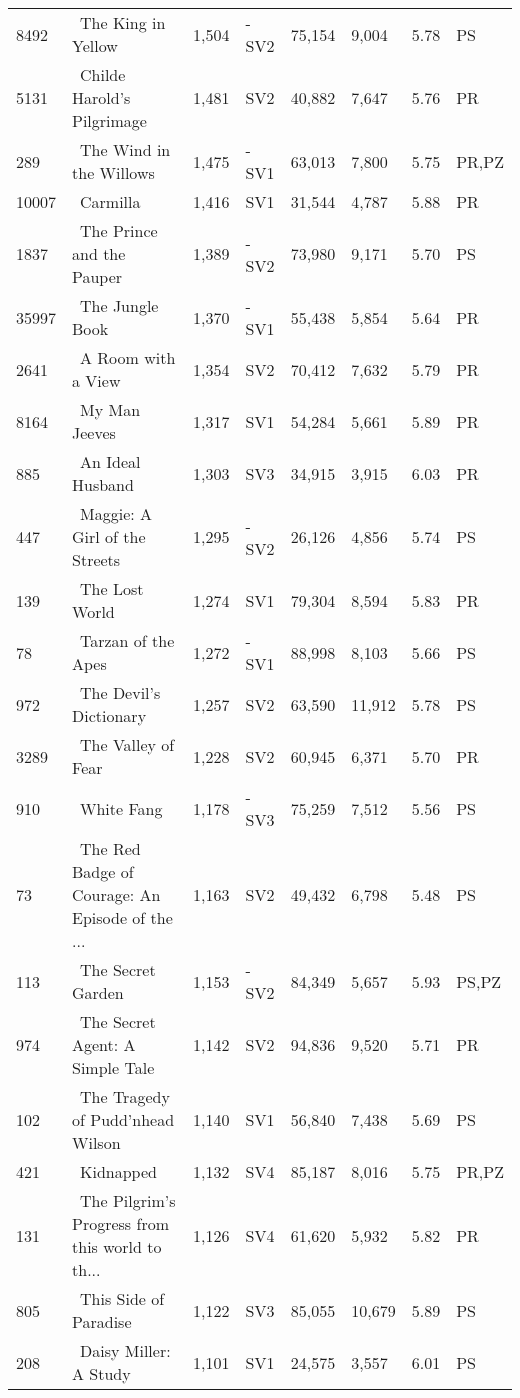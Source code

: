 \begin{longtable}{l | l | l | l | l | l | l | l}
8492 & ~The King in Yellow & 1,504 & -SV2 & 75,154 & 9,004 & 5.78 & PS\\
5131 & ~Childe Harold's Pilgrimage & 1,481 & SV2 & 40,882 & 7,647 & 5.76 & PR\\
289 & ~The Wind in the Willows & 1,475 & -SV1 & 63,013 & 7,800 & 5.75 & PR,PZ\\
10007 & ~Carmilla & 1,416 & SV1 & 31,544 & 4,787 & 5.88 & PR\\
1837 & ~The Prince and the Pauper & 1,389 & -SV2 & 73,980 & 9,171 & 5.70 & PS\\
35997 & ~The Jungle Book & 1,370 & -SV1 & 55,438 & 5,854 & 5.64 & PR\\
2641 & ~A Room with a View & 1,354 & SV2 & 70,412 & 7,632 & 5.79 & PR\\
8164 & ~My Man Jeeves & 1,317 & SV1 & 54,284 & 5,661 & 5.89 & PR\\
885 & ~An Ideal Husband & 1,303 & SV3 & 34,915 & 3,915 & 6.03 & PR\\
447 & ~Maggie: A Girl of the Streets & 1,295 & -SV2 & 26,126 & 4,856 & 5.74 & PS\\
139 & ~The Lost World & 1,274 & SV1 & 79,304 & 8,594 & 5.83 & PR\\
78 & ~Tarzan of the Apes & 1,272 & -SV1 & 88,998 & 8,103 & 5.66 & PS\\
972 & ~The Devil's Dictionary & 1,257 & SV2 & 63,590 & 11,912 & 5.78 & PS\\
3289 & ~The Valley of Fear & 1,228 & SV2 & 60,945 & 6,371 & 5.70 & PR\\
910 & ~White Fang & 1,178 & -SV3 & 75,259 & 7,512 & 5.56 & PS\\
73 & ~The Red Badge of Courage: An Episode of the ... & 1,163 & SV2 & 49,432 & 6,798 & 5.48 & PS\\
113 & ~The Secret Garden & 1,153 & -SV2 & 84,349 & 5,657 & 5.93 & PS,PZ\\
974 & ~The Secret Agent: A Simple Tale & 1,142 & SV2 & 94,836 & 9,520 & 5.71 & PR\\
102 & ~The Tragedy of Pudd'nhead Wilson & 1,140 & SV1 & 56,840 & 7,438 & 5.69 & PS\\
421 & ~Kidnapped & 1,132 & SV4 & 85,187 & 8,016 & 5.75 & PR,PZ\\
131 & ~The Pilgrim's Progress from this world to th... & 1,126 & SV4 & 61,620 & 5,932 & 5.82 & PR\\
805 & ~This Side of Paradise & 1,122 & SV3 & 85,055 & 10,679 & 5.89 & PS\\
208 & ~Daisy Miller: A Study & 1,101 & SV1 & 24,575 & 3,557 & 6.01 & PS\\

\end{longtable}
